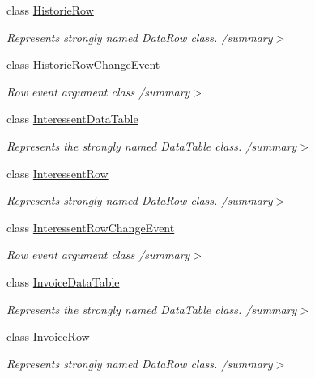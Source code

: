 \begin{DoxyCompactItemize}
class \hyperlink{class_products_1_1_data_1_1ds_sage_1_1_historie_row}{Historie\+Row}
\begin{DoxyCompactList}\small\item\em Represents strongly named Data\+Row class. /summary$>$ \end{DoxyCompactList}\item 
class \hyperlink{class_products_1_1_data_1_1ds_sage_1_1_historie_row_change_event}{Historie\+Row\+Change\+Event}
\begin{DoxyCompactList}\small\item\em Row event argument class /summary$>$ \end{DoxyCompactList}\item 
class \hyperlink{class_products_1_1_data_1_1ds_sage_1_1_interessent_data_table}{Interessent\+Data\+Table}
\begin{DoxyCompactList}\small\item\em Represents the strongly named Data\+Table class. /summary$>$ \end{DoxyCompactList}\item 
class \hyperlink{class_products_1_1_data_1_1ds_sage_1_1_interessent_row}{Interessent\+Row}
\begin{DoxyCompactList}\small\item\em Represents strongly named Data\+Row class. /summary$>$ \end{DoxyCompactList}\item 
class \hyperlink{class_products_1_1_data_1_1ds_sage_1_1_interessent_row_change_event}{Interessent\+Row\+Change\+Event}
\begin{DoxyCompactList}\small\item\em Row event argument class /summary$>$ \end{DoxyCompactList}\item 
class \hyperlink{class_products_1_1_data_1_1ds_sage_1_1_invoice_data_table}{Invoice\+Data\+Table}
\begin{DoxyCompactList}\small\item\em Represents the strongly named Data\+Table class. /summary$>$ \end{DoxyCompactList}\item 
class \hyperlink{class_products_1_1_data_1_1ds_sage_1_1_invoice_row}{Invoice\+Row}
\begin{DoxyCompactList}\small\item\em Represents strongly named Data\+Row class. /summary$>$ \end{DoxyCompactList}\item 

\end{DoxyCompactItemize}
